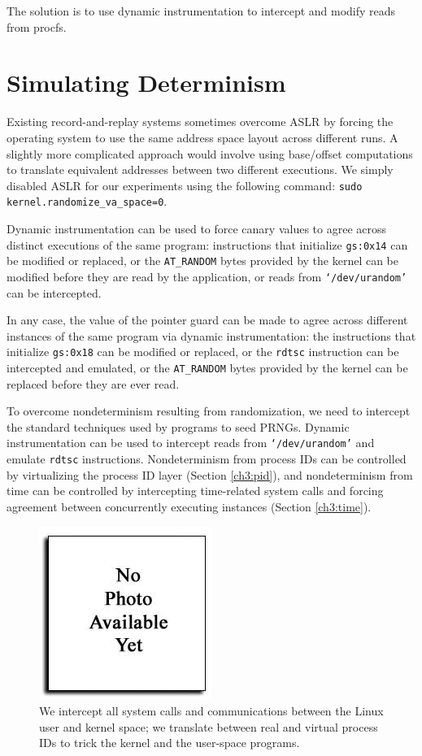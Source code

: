 The solution is to use dynamic instrumentation
to intercept and modify reads 
from procfs.

\section{Simulating Determinism} \label{ch3:simulation}

Existing record-and-replay systems sometimes overcome ASLR by
forcing the operating system to use the same address space layout across
different runs. A slightly more complicated approach would involve
using base/offset computations to translate equivalent 
addresses between two different executions. 
We simply disabled ASLR for our experiments using the following command:
\texttt {sudo kernel.randomize\_va\_space=0}.



Dynamic instrumentation can be used to force canary values
to agree across distinct executions of the same program:
instructions that initialize \texttt{gs:0x14} can be
modified or replaced, or the \texttt{AT\_RANDOM} bytes provided by the kernel can be
modified before they are read by the application, or reads from \texttt{`/dev/urandom'} can be 
intercepted.

 In any case, the value of the pointer
guard can be made to agree across different instances
of the same program via dynamic instrumentation: 
the instructions that initialize \texttt{gs:0x18} can
be modified or replaced, or the \texttt{rdtsc} instruction
can be intercepted and emulated, or the  \texttt{AT\_RANDOM} bytes provided by the kernel can be
replaced before they are ever read.

To overcome nondeterminism resulting from randomization, 
we need to intercept the standard techniques
used by programs to seed PRNGs.
Dynamic instrumentation can be used to 
intercept reads from \texttt{`/dev/urandom'}
and emulate \texttt{rdtsc} instructions.
Nondeterminism from process IDs
can be controlled by virtualizing the process ID
layer (Section \ref{ch3:pid}), and nondeterminism
from time can be controlled by intercepting
time-related system calls and forcing
agreement between concurrently executing 
instances (Section \ref{ch3:time}).

\begin{figure}[h]
  \center
  \includegraphics[trim=0cm 0cm 0cm 0cm, scale=0.75]{none.jpg}
  \caption[Virtualizing the process ID layer using Pin]%
  {We intercept all system calls and communications
  between the Linux user and kernel space; we
  translate between real and virtual process IDs
  to trick the kernel and the user-space programs.}
  \label{ch3:pidfig}
\end{figure} 


